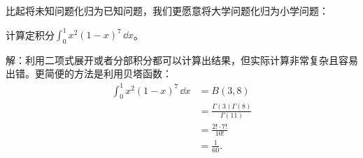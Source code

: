 比起将未知问题化归为已知问题，我们更愿意将大学问题化归为小学问题：
\begin{example}[贝塔函数的使用]
    计算定积分$\int_{0}^{1}x^2(1-x)^7\,\dd x$。

    解：利用二项式展开或者分部积分都可以计算出结果，但实际计算非常复杂且容易出错。更简便的方法是利用贝塔函数：
    \begin{align}
        \int_{0}^{1}x^2(1-x)^7\,\dd x&=B(3,8)\nonumber\\
                                     &=\frac{\Gamma(3)\Gamma(8)}{\Gamma(11)}\nonumber\\
                                     &=\frac{2! \cdot 7!}{10!}\nonumber\\
                                     &=\frac{1}{60}.
    \end{align}
\end{example}

